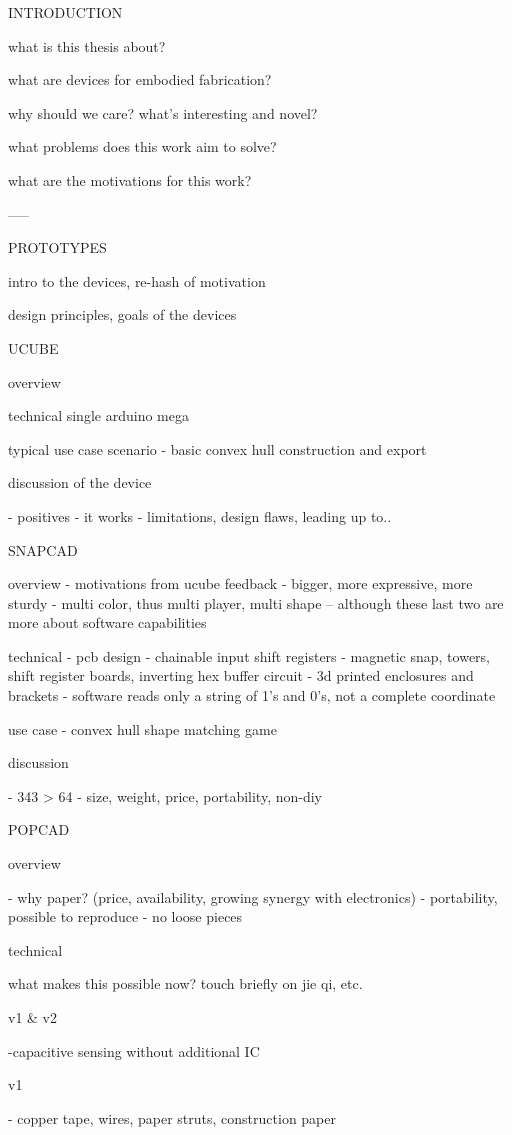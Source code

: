 
INTRODUCTION

what is this thesis about?

what are devices for embodied fabrication?

why should we care? what's interesting and novel?

what problems does this work aim to solve?

what are the motivations for this work?

-----


PROTOTYPES

intro to the devices, re-hash of motivation

design principles, goals of the devices


UCUBE

overview

technical
single arduino mega

typical use case scenario
- basic convex hull construction and export

discussion of the device

- positives - it works
- limitations, design flaws, leading up to..

SNAPCAD

overview
- motivations from ucube feedback
- bigger, more expressive, more sturdy
- multi color, thus multi player, multi shape -- although these last two are
more about software capabilities

technical
- pcb design - chainable input shift registers
- magnetic snap, towers, shift register boards, inverting hex buffer circuit
- 3d printed enclosures and brackets
- software reads only a string of 1's and 0's, not a complete coordinate

use case
- convex hull shape matching game

discussion

- 343 > 64
- size, weight, price, portability, non-diy


POPCAD

overview

- why paper? (price, availability, growing synergy with electronics)
- portability, possible to reproduce
- no loose pieces

technical

what makes this possible now? touch briefly on jie qi, etc.

v1 & v2

-capacitive sensing without additional IC

v1

- copper tape, wires, paper struts, construction paper


